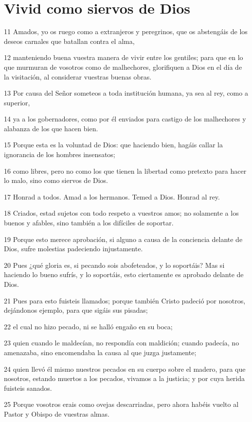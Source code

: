 \section*{Vivid como siervos de Dios}

\par 11 Amados, yo os ruego como a extranjeros y peregrinos, que os abstengáis de los deseos carnales que batallan contra el alma,
\par 12 manteniendo buena vuestra manera de vivir entre los gentiles; para que en lo que murmuran de vosotros como de malhechores, glorifiquen a Dios en el día de la visitación, al considerar vuestras buenas obras.
\par 13 Por causa del Señor someteos a toda institución humana, ya sea al rey, como a superior,
\par 14 ya a los gobernadores, como por él enviados para castigo de los malhechores y alabanza de los que hacen bien.
\par 15 Porque esta es la voluntad de Dios: que haciendo bien, hagáis callar la ignorancia de los hombres insensatos;
\par 16 como libres, pero no como los que tienen la libertad como pretexto para hacer lo malo, sino como siervos de Dios.
\par 17 Honrad a todos. Amad a los hermanos. Temed a Dios. Honrad al rey.
\par 18 Criados, estad sujetos con todo respeto a vuestros amos; no solamente a los buenos y afables, sino también a los difíciles de soportar.
\par 19 Porque esto merece aprobación, si alguno a causa de la conciencia delante de Dios, sufre molestias padeciendo injustamente.
\par 20 Pues ¿qué gloria es, si pecando sois abofeteados, y lo soportáis? Mas si haciendo lo bueno sufrís, y lo soportáis, esto ciertamente es aprobado delante de Dios.
\par 21 Pues para esto fuisteis llamados; porque también Cristo padeció por nosotros, dejándonos ejemplo, para que sigáis sus pisadas;
\par 22 el cual no hizo pecado, ni se halló engaño en su boca;
\par 23 quien cuando le maldecían, no respondía con maldición; cuando padecía, no amenazaba, sino encomendaba la causa al que juzga justamente;
\par 24 quien llevó él mismo nuestros pecados en su cuerpo sobre el madero, para que nosotros, estando muertos a los pecados, vivamos a la justicia; y por cuya herida fuisteis sanados.
\par 25 Porque vosotros erais como ovejas descarriadas, pero ahora habéis vuelto al Pastor y Obispo de vuestras almas.


